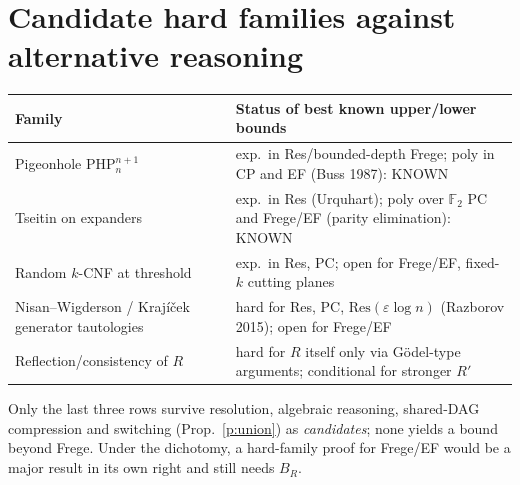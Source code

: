 \documentclass[11pt]{article}
\theoremstyle{remark}
\begin{document}
\section{Candidate hard families against alternative reasoning}
\begin{center}
\begin{tabular}{l|l}
Family & Status of best known upper/lower bounds\\\hline
Pigeonhole $\mathrm{PHP}^{n+1}_n$ & exp.\ in Res/bounded-depth Frege; poly in CP and EF (Buss 1987): KNOWN\\
Tseitin on expanders & exp.\ in Res (Urquhart); poly over $\mathbb F_2$ PC and Frege/EF (parity elimination): KNOWN\\
Random $k$-CNF at threshold & exp.\ in Res, PC; open for Frege/EF, fixed-$k$ cutting planes\\
Nisan--Wigderson / Krajíček generator tautologies & hard for Res, PC, $\mathrm{Res}(\varepsilon\log n)$ (Razborov 2015); open for Frege/EF\\
Reflection/consistency of $R$ & hard for $R$ itself only via G\"odel-type arguments; conditional for stronger $R'$\\
\end{tabular}
\end{center}
Only the last three rows survive resolution, algebraic reasoning, shared-DAG compression and
switching (Prop.~\ref{p:union}) as \emph{candidates}; none yields a bound beyond Frege. Under the dichotomy,
a hard-family proof for Frege/EF would be a major result in its own right and still needs $B_R$.
\end{document}
